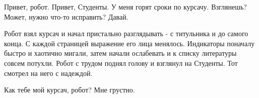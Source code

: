 \begin{dialog}
\X Привет, робот.
\R Привет, Студенты.
\X У меня горят сроки по курсачу. Взглянешь? Может, нужно что-то исправить?
\R Давай.
\end{dialog}

\begin{monolog}
Робот взял курсач и начал пристально разглядывать - с титульника и до самого конца. С каждой страницей выражение его лица менялось. Индикаторы поначалу быстро и хаотично мигали, затем начали ослабевать и к списку литературы совсем потухли. Робот с трудом поднял голову и взглянул на Студенты. Тот смотрел на него с надеждой.
\end{monolog}

\begin{dialog}
\X Как тебе мой курсач, робот?
\R Мне грустно.
\end{dialog}